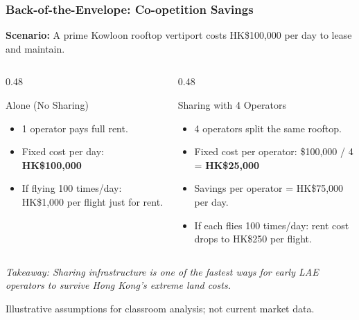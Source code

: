 \documentclass{beamer}
\begin{document}
\begin{frame}[t, shrink=10]
  \frametitle{Back-of-the-Envelope: Co-opetition Savings}
 
  \textbf{Scenario:} A prime Kowloon rooftop vertiport costs HK\$100,000 per day to lease and maintain.
  \vspace{0.3cm}
  \begin{columns}[T]
    \begin{column}{0.48\textwidth}
      \begin{block}{Alone (No Sharing)}
      \begin{itemize}
          \item 1 operator pays full rent.
          \item Fixed cost per day: \textbf{HK\$100,000}
          \item If flying 100 times/day: HK\$1,000 per flight just for rent.
      \end{itemize}
      \end{block}
    \end{column}
    \begin{column}{0.48\textwidth}
      \begin{block}{Sharing with 4 Operators}
      \begin{itemize}
          \item 4 operators split the same rooftop.
          \item Fixed cost per operator: \$100,000 / 4 = \textbf{HK\$25,000}
          \item Savings per operator = HK\$75,000 per day.
          \item If each flies 100 times/day: rent cost drops to HK\$250 per flight.
      \end{itemize}
      \end{block}
    \end{column}
  \end{columns}
  
  \vspace{0.4cm}
  \textit{Takeaway: Sharing infrastructure is one of the fastest ways for early LAE operators to survive Hong Kong’s extreme land costs.}

\vfill
{\tiny Illustrative assumptions for classroom analysis; not current market data.}
\end{frame}
\end{document}
